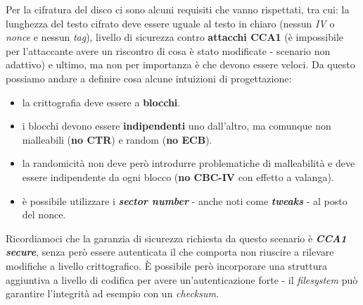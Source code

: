 \begin{flushleft}
    Per la cifratura del disco ci sono alcuni requisiti che vanno rispettati, tra cui: la lunghezza del testo cifrato deve essere uguale al testo in chiaro (nessun \textit{IV} o \textit{nonce} e nessun \textit{tag}), livello di sicurezza contro \textbf{attacchi CCA1} (è impossibile per l'attaccante avere un riscontro di cosa è stato modificate - scenario non adattivo) e ultimo, ma non per importanza è che devono essere veloci. Da questo possiamo andare a definire cosa alcune intuizioni di progettazione:
    \begin{itemize}[nosep]
        \item la crittografia deve essere a \textbf{blocchi}.
        \item i blocchi devono essere \textbf{indipendenti} uno dall'altro, ma comunque non malleabili (\textbf{no CTR}) e random (\textbf{no ECB}).
        \item la randomicità non deve però introdurre problematiche di malleabilità e deve essere indipendente da ogni blocco (\textbf{no CBC-IV} con effetto a valanga).
        \item è possibile utilizzare i \textbf{\textit{sector number}} - anche noti come \textbf{\textit{tweaks}} - al posto del nonce.
    \end{itemize}
    Ricordiamoci che la garanzia di sicurezza richiesta da questo scenario è \textbf{\textit{CCA1 secure}}, senza però essere autenticata il che comporta non riuscire a rilevare modifiche a livello crittografico. È possibile però incorporare una struttura aggiuntiva a livello di codifica per avere un'autenticazione forte - il \textit{filesystem} può garantire l'integrità ad esempio con un \textit{checksum}.
\end{flushleft}

